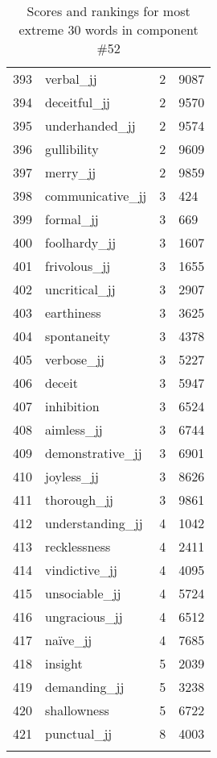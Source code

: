 \begin{longtable}[!htbp]{| rlr@{.}l |}
    393 & verbal\_jj & 2 & 9087 \\
    394 & deceitful\_jj & 2 & 9570 \\
    395 & underhanded\_jj & 2 & 9574 \\
    396 & gullibility & 2 & 9609 \\
    397 & merry\_jj & 2 & 9859 \\
    398 & communicative\_jj & 3 & 424 \\
    399 & formal\_jj & 3 & 669 \\
    400 & foolhardy\_jj & 3 & 1607 \\
    401 & frivolous\_jj & 3 & 1655 \\
    402 & uncritical\_jj & 3 & 2907 \\
    403 & earthiness & 3 & 3625 \\
    404 & spontaneity & 3 & 4378 \\
    405 & verbose\_jj & 3 & 5227 \\
    406 & deceit & 3 & 5947 \\
    407 & inhibition & 3 & 6524 \\
    408 & aimless\_jj & 3 & 6744 \\
    409 & demonstrative\_jj & 3 & 6901 \\
    410 & joyless\_jj & 3 & 8626 \\
    411 & thorough\_jj & 3 & 9861 \\
    412 & understanding\_jj & 4 & 1042 \\
    413 & recklessness & 4 & 2411 \\
    414 & vindictive\_jj & 4 & 4095 \\
    415 & unsociable\_jj & 4 & 5724 \\
    416 & ungracious\_jj & 4 & 6512 \\
    417 & naïve\_jj & 4 & 7685 \\
    418 & insight & 5 & 2039 \\
    419 & demanding\_jj & 5 & 3238 \\
    420 & shallowness & 5 & 6722 \\
    421 & punctual\_jj & 8 & 4003 \\
    \hline
    \caption{Scores and rankings for most extreme 30 words in component \#52} \\
\end{longtable}
